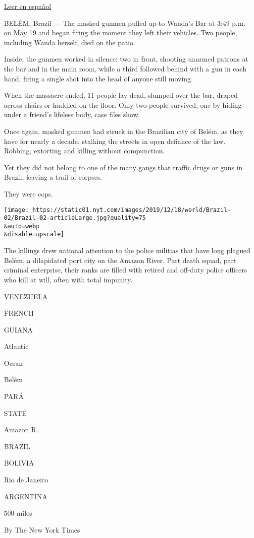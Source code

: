 \href{https://www.nytimes.com/es/2019/12/26/espanol/america-latina/policias-brasil-ejecuciones.html}{Leer
en español}

BELÉM, Brazil --- The masked gunmen pulled up to Wanda's Bar at 3:49
p.m. on May 19 and began firing the moment they left their vehicles. Two
people, including Wanda herself, died on the patio.

Inside, the gunmen worked in silence: two in front, shooting unarmed
patrons at the bar and in the main room, while a third followed behind
with a gun in each hand, firing a single shot into the head of anyone
still moving.

When the massacre ended, 11 people lay dead, slumped over the bar,
draped across chairs or huddled on the floor. Only two people survived,
one by hiding under a friend's lifeless body, case files show.

Once again, masked gunmen had struck in the Brazilian city of Belém, as
they have for nearly a decade, stalking the streets in open defiance of
the law. Robbing, extorting and killing without compunction.

Yet they did not belong to one of the many gangs that traffic drugs or
guns in Brazil, leaving a trail of corpses.

They were cops.

\texttt{[image: https://static01.nyt.com/images/2019/12/18/world/Brazil-02/Brazil-02-articleLarge.jpg?quality=75\\\&auto=webp\\\&disable=upscale]}

The killings drew national attention to the police militias that have
long plagued Belém, a dilapidated port city on the Amazon River. Part
death squad, part criminal enterprise, their ranks are filled with
retired and off-duty police officers who kill at will, often with total
impunity.

VENEZUELA

FRENCH

GUIANA

Atlantic

Ocean

Belém

PARÁ

STATE

Amazon R.

BRAZIL

BOLIVIA

Rio de Janeiro

ARGENTINA

500 miles

By The New York Times

